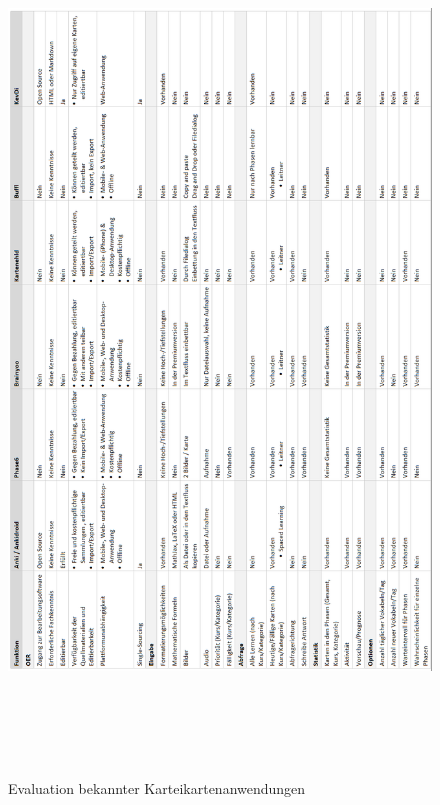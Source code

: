 \begin{figure}[htbp]
\begin{center}
\includegraphics[width = 15cm, height=23cm]{evaluation.png}
\caption{Evaluation bekannter Karteikartenanwendungen}
\label{Evaluation bekannter Karteikartenanwendungen}

\end{center}
\end{figure}


